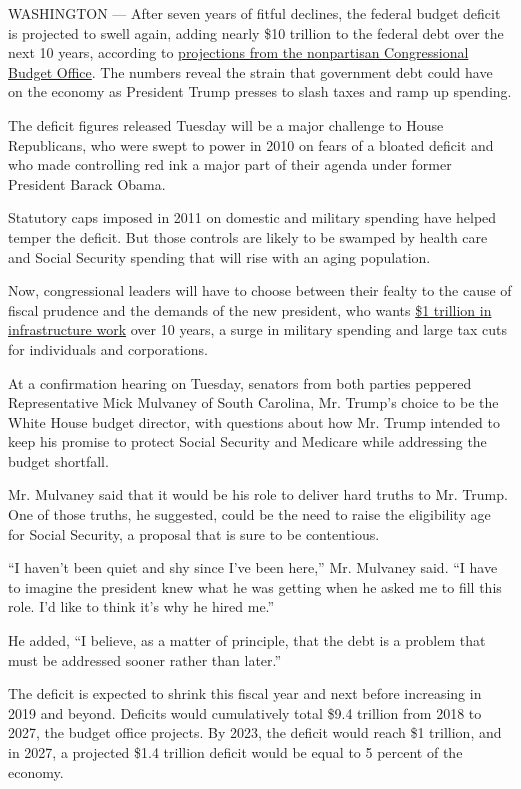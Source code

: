 WASHINGTON --- After seven years of fitful declines, the federal budget
deficit is projected to swell again, adding nearly \$10 trillion to the
federal debt over the next 10 years, according to
\href{https://www.cbo.gov/publication/52370}{projections from the
nonpartisan Congressional Budget Office}. The numbers reveal the strain
that government debt could have on the economy as President Trump
presses to slash taxes and ramp up spending.

The deficit figures released Tuesday will be a major challenge to House
Republicans, who were swept to power in 2010 on fears of a bloated
deficit and who made controlling red ink a major part of their agenda
under former President Barack Obama.

Statutory caps imposed in 2011 on domestic and military spending have
helped temper the deficit. But those controls are likely to be swamped
by health care and Social Security spending that will rise with an aging
population.

Now, congressional leaders will have to choose between their fealty to
the cause of fiscal prudence and the demands of the new president, who
wants
\href{https://www.nytimes.com/2016/11/10/nyregion/what-trump-clinton-and-voters-agreed-on-better-infrastructure.html}{\$1
trillion in infrastructure work} over 10 years, a surge in military
spending and large tax cuts for individuals and corporations.

At a confirmation hearing on Tuesday, senators from both parties
peppered Representative Mick Mulvaney of South Carolina, Mr. Trump's
choice to be the White House budget director, with questions about how
Mr. Trump intended to keep his promise to protect Social Security and
Medicare while addressing the budget shortfall.

Mr. Mulvaney said that it would be his role to deliver hard truths to
Mr. Trump. One of those truths, he suggested, could be the need to raise
the eligibility age for Social Security, a proposal that is sure to be
contentious.

``I haven't been quiet and shy since I've been here,'' Mr. Mulvaney
said. ``I have to imagine the president knew what he was getting when he
asked me to fill this role. I'd like to think it's why he hired me.''

He added, ``I believe, as a matter of principle, that the debt is a
problem that must be addressed sooner rather than later.''

The deficit is expected to shrink this fiscal year and next before
increasing in 2019 and beyond. Deficits would cumulatively total \$9.4
trillion from 2018 to 2027, the budget office projects. By 2023, the
deficit would reach \$1 trillion, and in 2027, a projected \$1.4
trillion deficit would be equal to 5 percent of the economy.


